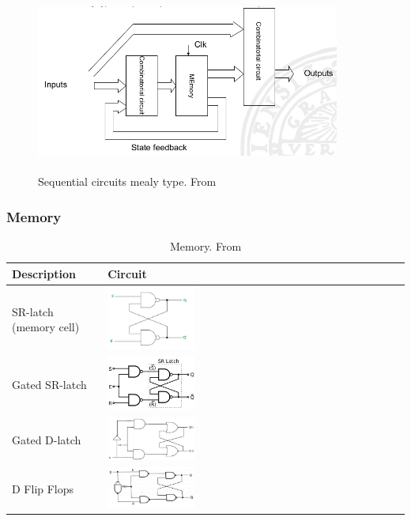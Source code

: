 \begin{figure}[h]
    \vspace{10mm}
    \centering
    \includegraphics[width=10cm, height=6cm]{image/sequential-circuits-mealy-type.png}
    \caption{Sequential circuits mealy type. From \cite{}}
\end{figure}

\newpage
\subsubsection{Memory}
\begin{table}[h!]
    \centering
    \begin{tabular}{ | m{5cm} | m{5cm} | }
        \hline
        Description & Circuit \\
        \hline
        SR-latch (memory cell)    
        &
        \includegraphics[width=0.3\textwidth]{image/SR_latch.png} \\
        \hline
        Gated SR-latch
        &
        \includegraphics[width=0.3\textwidth]{image/Gated_SR_Latch.png} \\
        \hline
        Gated D-latch
        &
        \includegraphics[width=0.3\textwidth]{image/Gated_D_latch.png} \\
        \hline
        D Flip Flops
        &
        \includegraphics[width=0.3\textwidth]{image/D_Flip_Flop.png} \\
        \hline
    \end{tabular}
    \caption{Memory. From \cite{}}\label{tbl:memory}
\end{table}

